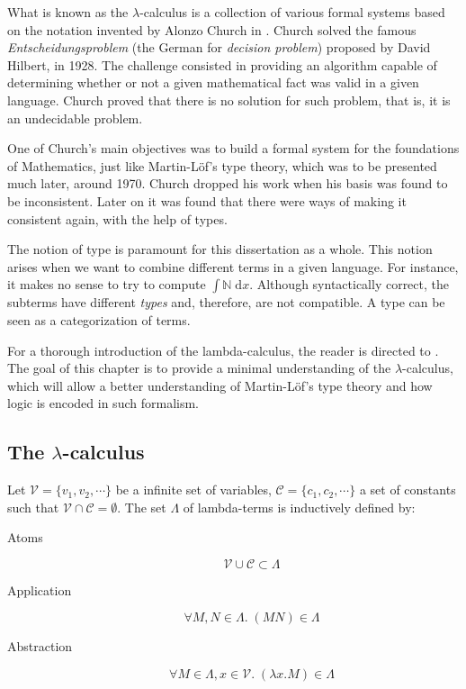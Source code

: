 What is known as the $\lambda$-calculus is a collection of various formal systems based 
on the notation invented by Alonzo Church in \cite{Church01,Church02}. 
Church solved the famous \textit{Entscheidungsproblem} (the German for \textit{decision problem}) 
proposed by David Hilbert, in 1928. The challenge consisted in providing an algorithm capable
of determining whether or not a given mathematical fact was valid in a given language. 
Church proved that there is no solution for such problem, that is, it is an undecidable problem.

One of Church's main objectives was to build a formal system for the foundations of
Mathematics, just like Martin-Löf's type theory, which was to be presented much later, around 1970. 
Church dropped his work when his basis was found to be inconsistent. Later on it was found
that there were ways of making it consistent again, with the help of types.

The notion of type is paramount for this dissertation as a whole. This notion arises when we want 
to combine different terms in a given language. For instance, it makes no sense to try
to compute $\int \mathbb{N}\;\mathrm{d}x$. Although syntactically correct, the subterms have
different \emph{types} and, therefore, are not compatible. A type can be seen as a
categorization of terms.

For a thorough introduction of the lambda-calculus, the reader is directed to \cite{Barendregt01,Hindley01}.
The goal of this chapter is to provide a minimal understanding of the $\lambda$-calculus, which
will allow a better understanding of Martin-L\"{o}f's type theory and how logic is encoded
in such formalism.

\subsection{The $\lambda$-calculus}

\begin{mydef} Let $\mathcal{V} = \{v_1, v_2, \cdots\}$ be a infinite set of
variables, $\mathcal{C}=\{c_1, c_2, \cdots\}$ a set of constants such that 
$\mathcal{V} \cap \mathcal{C} = \emptyset$. The set $\Lambda$ of lambda-terms is 
inductively defined by:
\begin{description}
  \item[Atoms]
        \[ \mathcal{V} \cup \mathcal{C} \subset \Lambda \]
  \item[Application]  
        \[ \forall M, N \in \Lambda.\; (M N) \in \Lambda \]
  \item[Abstraction]
        \[ \forall M \in \Lambda, x \in \mathcal{V}.\; (\lambda x . M) \in \Lambda \]
\end{description}
\end{mydef}

